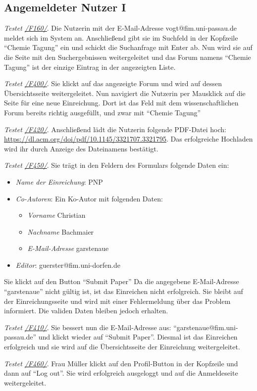 \subsection{Angemeldeter Nutzer I}
\begin{description}

	 \emph{Testet \hyperref[funkt:160]{/F160/}}.
	Die Nutzerin mit der E-Mail-Adresse vogt@fim.uni-passau.de meldet sich im System an.
	Anschließend gibt sie im Suchfeld in der Kopfzeile ``Chemie Tagung'' ein und schickt die Suchanfrage mit Enter ab.
	Nun wird sie auf die Seite mit den Suchergebnissen weitergeleitet und das Forum namens ``Chemie Tagung'' ist der einzige Eintrag in der angezeigten Liste.

	 \emph{Testet \hyperref[funkt:400]{/F400/}}.
	Sie klickt auf das angezeigte Forum und wird auf dessen Übersichtsseite weitergeleitet.
	Nun navigiert die Nutzerin per Mausklick auf die Seite für eine neue Einreichung.
	Dort ist das Feld mit dem wissenschaftlichen Forum bereits richtig ausgefüllt, und zwar mit ``Chemie Tagung''

	 \emph{Testet \hyperref[funkt:420]{/F420/}}.
	Anschließend lädt die Nutzerin folgende PDF-Datei hoch: \href{https://dl.acm.org/doi/pdf/10.1145/3321707.3321795}{https://dl.acm.org/doi/pdf/10.1145/3321707.3321795}.
	Das erfolgreiche Hochladen wird ihr durch Anzeige des Dateinamens bestätigt.

	 \emph{Testet \hyperref[funkt:450]{/F450/}}.
	Sie trägt in den Feldern des Formulars folgende Daten ein:
	\begin{itemize}
		\item \emph{Name der Einreichung}: P\neq NP
		\item \emph{Co-Autoren}: Ein Ko-Autor mit folgenden Daten:
		\begin{itemize}
			\item \emph{Vorname} Christian
			\item \emph{Nachname} Bachmaier
			\item \emph{E-Mail-Adresse} garstenaue
		\end{itemize}
		\item \emph{Editor}: guerster@fim.uni-dorfen.de
	\end{itemize}
	Sie klickt auf den Button ``Submit Paper''
	Da die angegebene E-Mail-Adresse ``garstenaue'' nicht gültig ist, ist das Einreichen nicht erfolgreich.
	Sie bleibt auf der Einreichungsseite und wird mit einer Fehlermeldung über das Problem informiert.
	Die validen Daten bleiben jedoch erhalten.

	 \emph{Testet \hyperref[funkt:410]{/F410/}}.
	Sie bessert nun die E-Mail-Adresse aus: ``garstenaue@fim.uni-passau.de'' und klickt wieder auf ``Submit Paper''.
	Diesmal ist das Einreichen erfolgreich und sie wird auf die Übersichtsseite der Einreichung weitergeleitet.

	 \emph{Testet \hyperref[funkt:460]{/F460/}}.
	Frau Müller klickt auf den Profil-Button in der Kopfzeile und dann auf ``Log out''.
	Sie wird erfolgreich ausgeloggt und auf die Anmeldeseite weitergeleitet.
\end{description}

